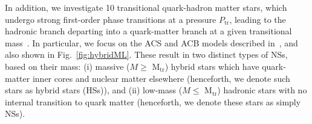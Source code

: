 \documentclass[prd,twocolumn,nofootinbib,superscriptaddress,amsmath,amssymb]{revtex4-1}
\begin{document}

{}

In addition, we investigate 10 transitional quark-hadron matter stars, which undergo strong first-order phase transitions at a pressure $P_{\text{tr}}$, leading to the hadronic branch departing into a quark-matter branch at a given transitional mass~\cite{Paschalidis2018,Alford:2017qgh,1971SvA....15..347S,Zdunik:2012dj,Alford:2013aca}. In particular, we focus on the ACS and ACB models described in~\cite{Paschalidis2018}, and also shown in Fig.~\ref{fig:hybridML}. These result in two distinct types of NSs, based on their mass: (i) massive ($M \geq \text{ M}_{\text{tr}}$) hybrid stars which have quark-matter inner cores and nuclear matter elsewhere (henceforth, we denote such stars as hybrid stars (HSs)), and (ii) low-mass ($M \leq \text{ M}_{\text{tr}}$) hadronic stars with no internal transition to quark matter (henceforth, we denote these stars as simply NSs).
\end{document}
